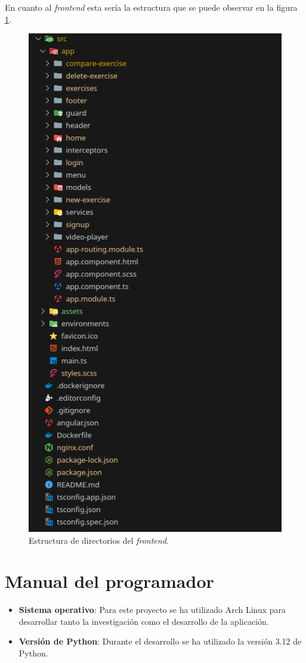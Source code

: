En cuanto al \textit{frontend} esta sería la estructura que se puede observar en la figura \ref{fig:estructurafrontend}.
\begin{figure}
	\centering
	\includegraphics[width=0.7\linewidth]{img/EstructuraDeDirectorios/EstructuraFrontend}
	\caption{Estructura de directorios del \textit{frontend}.}
	\label{fig:estructurafrontend}
\end{figure}



\section{Manual del programador}

\begin{itemize}
	\item \textbf{Sistema operativo}: Para este proyecto se ha utilizado Arch Linux para desarrollar tanto la investigación como el desarrollo de la aplicación.
	\item \textbf{Versión de Python}: Durante el desarrollo se ha utilizado la versión 3.12 de Python.
\end{itemize}

